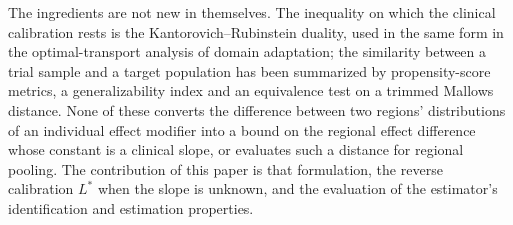 \documentclass[AMA,Times1COL]{WileyNJDv5}
\begin{document}
The ingredients are not new in themselves. The inequality on which the clinical calibration rests is the Kantorovich--Rubinstein duality, used in the same form in the optimal-transport analysis of domain adaptation;\cite{shen2018,redko2017} the similarity between a trial sample and a target population has been summarized by propensity-score metrics,\cite{stuart2011} a generalizability index\cite{tipton2014} and an equivalence test on a trimmed Mallows distance.\cite{munk1998} None of these converts the difference between two regions' distributions of an individual effect modifier into a bound on the regional effect difference whose constant is a clinical slope, or evaluates such a distance for regional pooling. The contribution of this paper is that formulation, the reverse calibration $L^*$ when the slope is unknown, and the evaluation of the estimator's identification and estimation properties.


\end{document}
